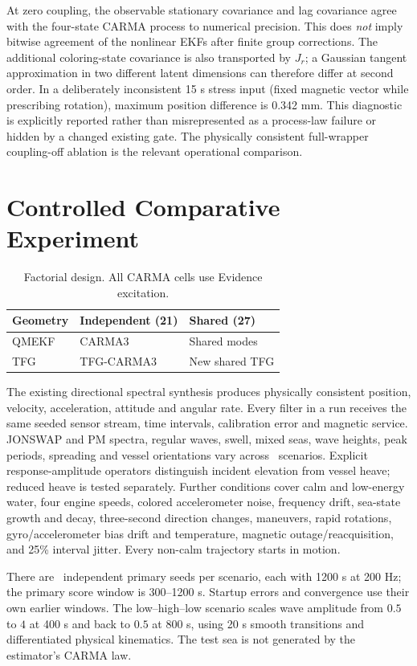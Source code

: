 \documentclass[conference]{IEEEtran}
\begin{document}
At zero coupling, the observable stationary covariance and lag covariance
agree with the four-state CARMA process to numerical precision. This does
\emph{not} imply bitwise agreement of the nonlinear EKFs after finite group
corrections. The additional coloring-state covariance is also transported by
$J_r$; a Gaussian tangent approximation in two different latent dimensions can
therefore differ at second order. In a deliberately inconsistent 15 s stress
input (fixed magnetic vector while prescribing rotation), maximum position
difference is 0.342 mm. This diagnostic is explicitly reported rather than
misrepresented as a process-law failure or hidden by a changed existing gate.
The physically consistent full-wrapper coupling-off ablation is the relevant
operational comparison. \RegressionResults

\section{Controlled Comparative Experiment}
\begin{table}[!t]\centering\caption{Factorial design. All CARMA cells use Evidence excitation.}
\begin{tabular}{lll}\toprule
Geometry&Independent (21)&Shared (27)\\\midrule
QMEKF&CARMA3&Shared modes\\
TFG&TFG-CARMA3&New shared TFG\\\bottomrule
\end{tabular}\end{table}
The existing directional spectral synthesis produces physically consistent
position, velocity, acceleration, attitude and angular rate. Every filter in a
run receives the same seeded sensor stream, time intervals, calibration error
and magnetic service. JONSWAP and PM spectra, regular waves, swell, mixed seas,
wave heights, peak periods, spreading and vessel orientations vary across
\ScenarioCount\ scenarios. Explicit response-amplitude operators distinguish
incident elevation from vessel heave; reduced heave is tested separately.
Further conditions cover calm and low-energy water, four engine speeds,
colored accelerometer noise, frequency drift, sea-state growth and decay,
three-second direction changes, maneuvers, rapid rotations, gyro/accelerometer
bias drift and temperature, magnetic outage/reacquisition, and 25\% interval
jitter. Every non-calm trajectory starts in motion.

There are \PrimarySeeds\ independent primary seeds per scenario, each with
1200 s at 200 Hz; the primary score window is 300--1200 s. Startup errors and
convergence use their own earlier windows. The low--high--low scenario scales
wave amplitude from $0.5$ to $4$ at 400 s and back to $0.5$ at 800 s, using
20 s smooth transitions and differentiated physical kinematics.
The test sea is not generated by the estimator's CARMA law.
\end{document}
